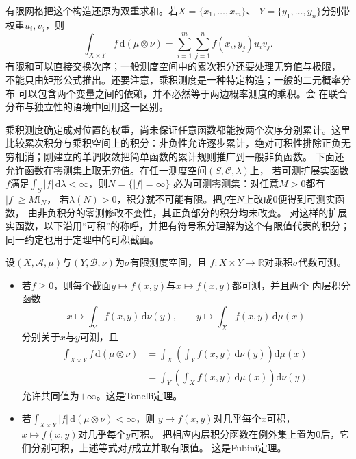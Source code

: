 有限网格把这个构造还原为双重求和。若$X=\{x_1,\ldots,x_m\}$、
$Y=\{y_1,\ldots,y_n\}$分别带权重$u_i,v_j$，则
\[
  \int_{X\times Y}f\,\mathrm{d}(\mu\otimes\nu)
  =
  \sum_{i=1}^m\sum_{j=1}^n f(x_i,y_j)u_iv_j.
\]
有限和可以直接交换次序；一般测度空间中的累次积分还要处理无穷值与极限，
不能只由矩形公式推出。还要注意，乘积测度是一种特定构造；一般的二元概率分布
可以包含两个变量之间的依赖，并不必然等于两边概率测度的乘积。会
在联合分布与独立性的语境中回用这一区别。

乘积测度确定成对位置的权重，尚未保证任意函数都能按两个次序分别累计。这里比较累次积分与乘积空间上的积分：非负性允许逐步累计，绝对可积性排除正负无穷相消；刚建立的单调收敛把简单函数的累计规则推广到一般非负函数。
下面还允许函数在零测集上取无穷值。在任一测度空间$(S,\mathcal C,\lambda)$上，
若可测扩展实函数$f$满足$\int_S|f|\,\mathrm d\lambda<\infty$，则$N=\{|f|=\infty\}$
必为可测零测集：对任意$M>0$都有$|f|\geq M\mathbb I_N$，
若$\lambda(N)>0$，积分就不可能有限。把$f$在$N$上改成$0$便得到可测实函数，
由非负积分的零测修改不变性，其正负部分的积分均未改变。
对这样的扩展实函数，以下沿用“可积”的称呼，并把有符号积分理解为这个有限值代表的积分；
同一约定也用于定理中的可积截面。
\begin{theorem}[Tonelli与Fubini定理]
\label{thm:analysis-tonelli-fubini}
设$(X,\mathcal{A},\mu)$与$(Y,\mathcal{B},\nu)$为$\sigma$有限测度空间，且 $f:X\times Y\to\overline{\mathbb{R}}$对乘积$\sigma$代数可测。
\begin{itemize}

\item 若$f\geq0$，则每个截面$y\mapsto f(x,y)$与$x\mapsto f(x,y)$都可测，并且两个
  内层积分函数
  \[
    x\longmapsto\int_Yf(x,y)\,\mathrm{d}\nu(y),
    \qquad
    y\longmapsto\int_Xf(x,y)\,\mathrm{d}\mu(x)
  \]
  分别关于$x$与$y$可测，且
  \[
    \begin{aligned}
      \int_{X\times Y}f\,\mathrm{d}(\mu\otimes\nu)
      &=
      \int_X\left(\int_Yf(x,y)\,\mathrm{d}\nu(y)\right)\mathrm{d}\mu(x)\\
      &=
      \int_Y\left(\int_Xf(x,y)\,\mathrm{d}\mu(x)\right)\mathrm{d}\nu(y).
    \end{aligned}
  \]
  允许共同值为$+\infty$。这是Tonelli定理。
\item 若$\int_{X\times Y}|f|\,\mathrm{d}(\mu\otimes\nu)<\infty$，则
  $y\mapsto f(x,y)$对几乎每个$x$可积，$x\mapsto f(x,y)$对几乎每个$y$可积。
  把相应内层积分函数在例外集上置为$0$后，它们分别可积，上述等式对$f$成立并取有限值。
  这是Fubini定理。
\end{itemize}
\end{theorem}

